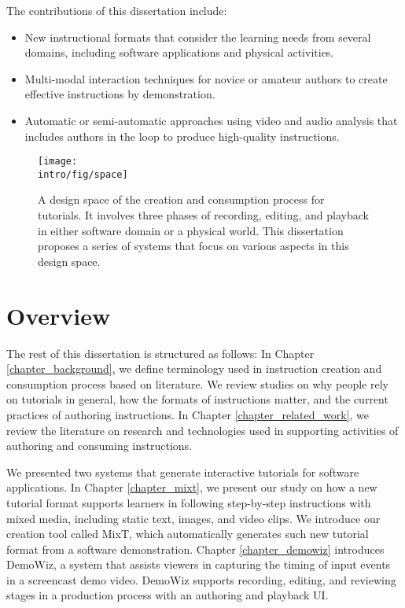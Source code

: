 The contributions of this dissertation include:

\begin{itemize}
\item New instructional formats that consider the learning needs from several domains, including software applications and physical activities.
\item Multi-modal interaction techniques for novice or amateur authors to create effective instructions by demonstration.
\item Automatic or semi-automatic approaches using video and audio analysis that includes authors in the loop to produce high-quality instructions.
\end{itemize}

\begin{figure}[t!]
  \centering
  \texttt{[image: \\intro/fig/space]}
  \caption{A design space of the creation and consumption process for tutorials. It involves three phases of recording, editing, and playback in either software domain or a physical world. This dissertation proposes a series of systems that focus on various aspects in this design space.}
  \label{fig:space}
\end{figure}


\section{Overview}

The rest of this dissertation is structured as follows:
%
In Chapter \ref{chapter_background}, we define terminology used in instruction creation and consumption process based on literature. We review studies on why people rely on tutorials in general, how the formats of instructions matter, and the current practices of authoring instructions.
%
In Chapter \ref{chapter_related_work}, we review the literature on research and technologies used in supporting activities of authoring and consuming instructions.

We presented two systems that generate interactive tutorials for software applications.
In Chapter \ref{chapter_mixt}, we present our study on how a new tutorial format supports learners in following step-by-step instructions with mixed media, including static text, images, and video clips. We introduce our creation tool called MixT, which automatically generates such new tutorial format from a software demonstration.
Chapter \ref{chapter_demowiz} introduces DemoWiz, a system that assists viewers in capturing the timing of input events in a screencast demo video. DemoWiz supports recording, editing, and reviewing stages in a production process with an authoring and playback UI.

